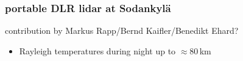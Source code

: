 \subsubsection{portable DLR lidar at Sodankyl\"a}
contribution by Markus Rapp/Bernd Kaifler/Benedikt Ehard?

\begin{itemize}
  \item Rayleigh temperatures during night up to $\approx 80$\,km
\end{itemize}